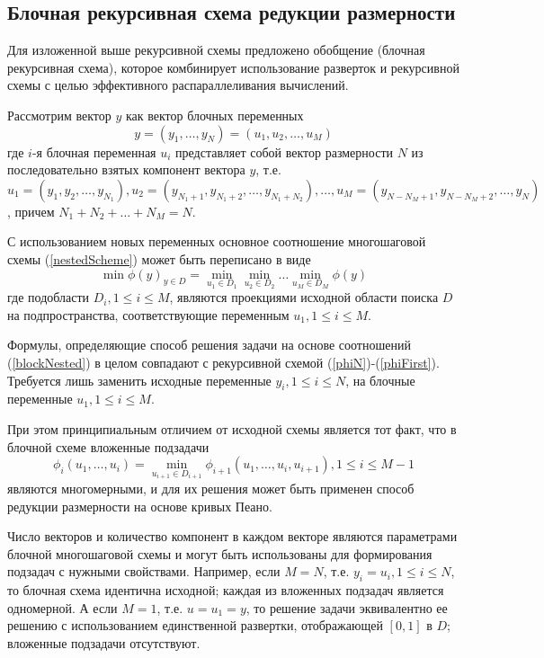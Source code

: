 \subsection{Блочная рекурсивная схема редукции размерности}
Для изложенной выше рекурсивной схемы предложено обобщение (блочная рекурсивная схема), которое комбинирует использование разверток и рекурсивной схемы с целью эффективного распараллеливания вычислений.
\par
Рассмотрим вектор \(y\) как вектор блочных переменных
\begin{displaymath}
y=(y_1,\dots,y_N)=(u_1,u_2,\dots,u_M)
\end{displaymath}
где \(i\)-я блочная переменная \(u_i\) представляет собой вектор размерности \(N\) из последовательно взятых компонент вектора \(y\), т.е. \(u_1=(y_1,y_2,\dots,y_{N_1}),u_2=(y_{N_1+1},y_{N_1+2},\dots,y_{N_1+N_2}),\dots,u_M=(y_{N-N_M+1},y_{N-N_M+2},\dots,y_N)\), причем \(N_1+N_2+\dots+N_M=N\).
\par
С использованием новых переменных основное соотношение многошаговой схемы (\ref{nestedScheme}) может быть переписано в виде
\begin{equation}
\label{blockNested}
\min\phi(y)_{y\in D}=\min_{u_1\in D_1}\min_{u_2\in D_2}\dots\min_{u_M\in D_M}\phi(y)
\end{equation}
где подобласти \(D_i,1\leqslant i\leqslant M\), являются проекциями исходной области поиска \(D\) на подпространства, соответствующие переменным \(u_1,1\leqslant i\leqslant M\).
\par
Формулы, определяющие способ решения задачи на основе соотношений (\ref{blockNested}) в целом совпадают с рекурсивной схемой (\ref{phiN})-(\ref{phiFirst}). Требуется лишь заменить исходные переменные \(y_i,1\leqslant i\leqslant N\), на блочные переменные \(u_1,1\leqslant i\leqslant M\).
\par
При этом принципиальным отличием от исходной схемы является тот факт, что в блочной схеме вложенные подзадачи
\begin{equation}
\label{subTasks}
\phi_i(u_1,\dots,u_i)=\min_{u_{i+1}\in D_{i+1}}\phi_{i+1}(u_1,\dots,u_i,u_{i+1}),1\leqslant i\leqslant M-1
\end{equation}
являются многомерными, и для их решения может быть применен способ редукции размерности на основе кривых Пеано.
\par
Число векторов и количество компонент в каждом векторе являются параметрами блочной многошаговой схемы и могут быть использованы для формирования подзадач с нужными свойствами. Например, если \(M=N\), т.е. \(y_i=u_i,1\leqslant i\leqslant N\), то блочная схема идентична исходной; каждая из вложенных подзадач является одномерной. А если \(M=1\), т.е. \(u=u_1=y\), то решение задачи эквивалентно ее решению с использованием единственной развертки, отображающей \([0,1]\) в \(D\); вложенные подзадачи отсутствуют.